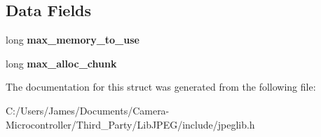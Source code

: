 \subsection*{Data Fields}
\begin{DoxyCompactItemize}
\item 
\mbox{\label{structjpeg__memory__mgr_a73f56026eac1a0bd4f9f748f49754fa2}} 
long {\bfseries max\+\_\+memory\+\_\+to\+\_\+use}
\item 
\mbox{\label{structjpeg__memory__mgr_a271a4a9278d21c5a90ef8daf944b21a7}} 
long {\bfseries max\+\_\+alloc\+\_\+chunk}
\end{DoxyCompactItemize}


The documentation for this struct was generated from the following file\+:\begin{DoxyCompactItemize}
\item 
C\+:/\+Users/\+James/\+Documents/\+Camera-\/\+Microcontroller/\+Third\+\_\+\+Party/\+Lib\+J\+P\+E\+G/include/jpeglib.\+h\end{DoxyCompactItemize}
